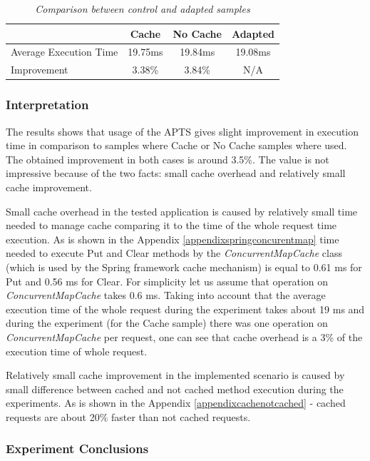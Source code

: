 \documentclass[12pt,a4paper]{article}
\begin{document}
\begin{table}[!htb]
\begin{center}
\begin{tabular}{l|c|c|c}
 & \textbf{Cache} & \textbf{No Cache} & \textbf{Adapted} \\ \hline
Average Execution Time &  19.75ms & 19.84ms & 19.08ms\\ \hline
Improvement &  3.38\% & 3.84\% & N/A\\ 
\end{tabular}
\end{center}
\caption{\textit{Comparison between control and adapted samples}} \label{cacheCompResutls}
\end{table}

\subsubsection{Interpretation} 

The results shows that usage of the APTS gives slight improvement in execution time in comparison to samples where Cache or No Cache samples where used. The obtained improvement in both cases is around 3.5\%. The value is not impressive because of the two facts: small cache overhead and relatively small cache improvement. 

Small cache overhead in the tested application is caused by relatively small time needed to manage cache comparing it to the time of the whole request time execution. As is shown in the Appendix \ref{appendixspringconcurentmap} time needed to execute Put and Clear methods by the \textit{ConcurrentMapCache} class (which is used by the Spring framework cache mechanism) is equal to 0.61 ms for Put and 0.56 ms for Clear. For simplicity let us assume that operation on \textit{ConcurrentMapCache} takes 0.6 ms. Taking into account that the average execution time of the whole request during the experiment takes about 19 ms and during the experiment (for the Cache sample) there was one operation on \textit{ConcurrentMapCache} per request, one can see that cache overhead is a 3\% of the execution time of whole request.  

Relatively small cache improvement in the implemented scenario is caused by small difference between cached and not cached method execution during the experiments. As is shown in the Appendix \ref{appendixcachenotcached} - cached requests are about 20\% faster than not cached requests. 

\subsubsection{Experiment Conclusions} 
\end{document}
